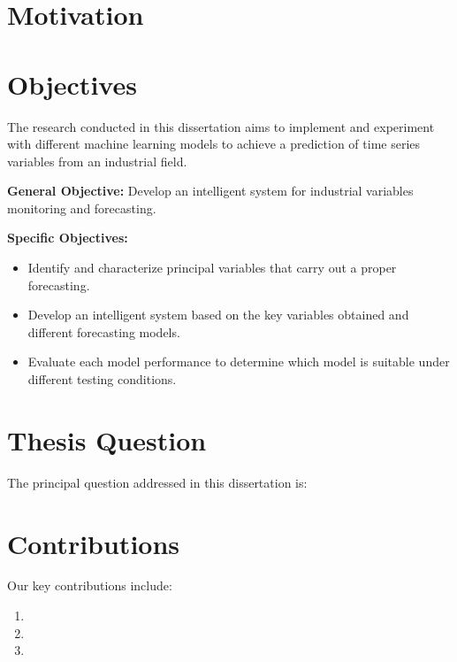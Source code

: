 
\section{Motivation}
\label{s:Motivation}


\section{Objectives}
\label{s:Objectives}
The research conducted in this dissertation aims to implement and experiment with different machine learning models to achieve a prediction of time series variables from an industrial field.


\textbf{General Objective:} Develop an intelligent system for industrial variables monitoring and forecasting.

\textbf{Specific Objectives:}

\begin{itemize}
\item Identify and characterize principal variables that carry out a proper forecasting.
\item Develop an intelligent system based on the key variables obtained and different forecasting models.
\item Evaluate each model performance to determine which model is suitable under different testing conditions.
\end{itemize}

\section{Thesis Question}
\label{s:Question}
The principal question addressed in this dissertation is:


\section{Contributions}
\label{s:Contributions}

Our key contributions include:

\begin{enumerate}

  \item {}
  
  \item {}
  
  \item {}

\end{enumerate}

